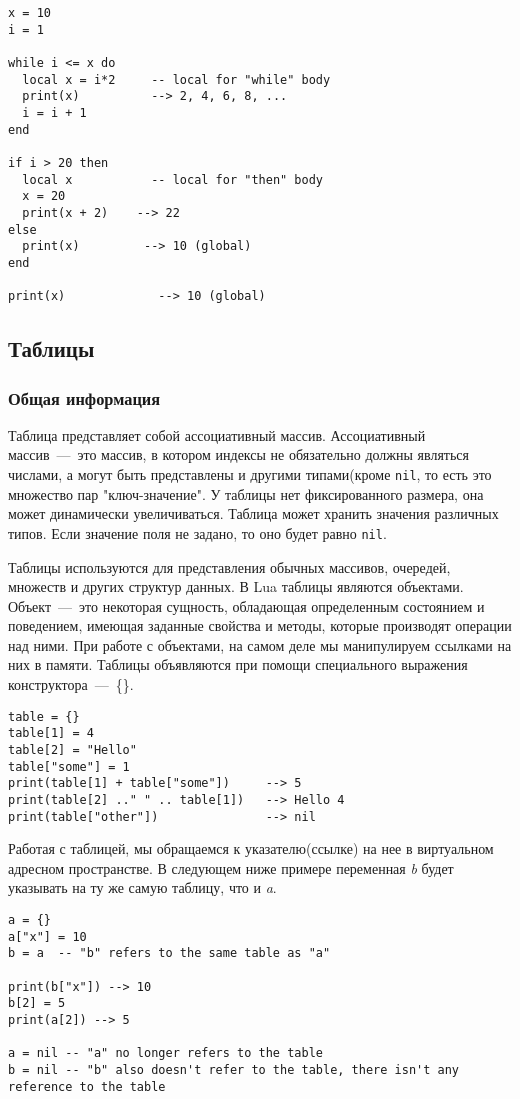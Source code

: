 \begin{lstlisting}
x = 10
i = 1  
    
while i <= x do
  local x = i*2     -- local for "while" body
  print(x)          --> 2, 4, 6, 8, ...
  i = i + 1
end
  
if i > 20 then
  local x           -- local for "then" body
  x = 20
  print(x + 2)	  --> 22
else
  print(x)         --> 10 (global)
end
    
print(x)             --> 10 (global)
\end{lstlisting}

\subsection{Таблицы}
\label{subsec:tables}

\subsubsection{Общая информация}

Таблица представляет собой ассоциативный массив. Ассоциативный массив~---~это массив, в котором индексы не обязательно должны являться числами, а могут быть представлены и другими типами(кроме \lstinline{nil}, то есть это множество пар "ключ-значение". У таблицы нет фиксированного размера, она может динамически увеличиваться. Таблица может хранить значения различных типов. Если значение поля не задано, то оно будет равно \lstinline{nil}. 

Таблицы используются для представления обычных массивов, очередей, множеств и других структур данных. В Lua таблицы являются объектами. Объект~---~это некоторая сущность, обладающая определенным состоянием и поведением, имеющая заданные свойства и методы, которые производят операции над ними. При работе с объектами, на самом деле мы манипулируем ссылками на них в памяти. Таблицы объявляются при помощи специального выражения  конструктора~---~\{\}. 

\begin{lstlisting}
table = {}
table[1] = 4
table[2] = "Hello"
table["some"] = 1
print(table[1] + table["some"])     --> 5
print(table[2] .." " .. table[1])   --> Hello 4
print(table["other"])               --> nil
\end{lstlisting}

Работая с таблицей, мы обращаемся к указателю(ссылке) на нее в виртуальном адресном пространстве.
В следующем ниже примере переменная \emph{b} будет указывать на ту же самую таблицу, что и \emph{a}.
\begin{lstlisting}
a = {}
a["x"] = 10
b = a  -- "b" refers to the same table as "a"  

print(b["x"]) --> 10
b[2] = 5
print(a[2]) --> 5
   
a = nil -- "a" no longer refers to the table
b = nil -- "b" also doesn't refer to the table, there isn't any reference to the table 
\end{lstlisting} 

